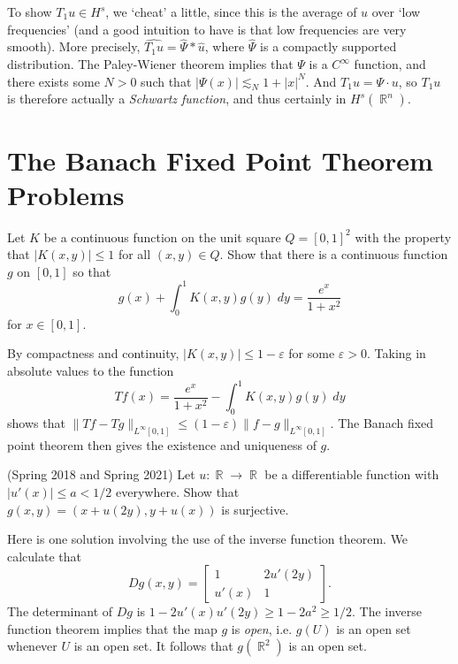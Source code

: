 \documentclass[answers]{exam}
\DeclareMathOperator{\RR}{\mathbb{R}}
\begin{document}
\begin{questions}
\begin{solution}
    To show $T_1 u \in H^s$, we `cheat' a little, since this is the average of $u$ over `low frequencies' (and a good intuition to have is that low frequencies are very smooth). More precisely, $\widehat{T_1 u} = \widehat{\Psi} * \widehat{u}$, where $\widehat{\Psi}$ is a compactly supported distribution. The Paley-Wiener theorem implies that $\Psi$ is a $C^\infty$ function, and there exists some $N > 0$ such that $|\Psi(x)| \lesssim_N 1 + |x|^N$. And $T_1 u = \Psi \cdot u$, so $T_1 u$ is therefore actually a \emph{Schwartz function}, and thus certainly in $H^s(\RR^n)$.
\end{solution}

\newpage
\section{The Banach Fixed Point Theorem Problems}

\question Let $K$ be a continuous function on the unit square $Q = [0,1]^2$ with the property that $|K(x,y)| \leq 1$ for all $(x,y) \in Q$. Show that there is a continuous function $g$ on $[0,1]$ so that
%
\[ g(x) + \int_0^1 K(x,y) g(y)\; dy = \frac{e^x}{1 + x^2} \]
%
for $x \in [0,1]$.
\begin{solution}
	By compactness and continuity, $|K(x,y)| \leq 1 - \varepsilon$ for some $\varepsilon > 0$. Taking in absolute values to the function
	\[ Tf(x) = \frac{e^x}{1 + x^2} - \int_0^1 K(x,y) g(y)\; dy \]
	shows that $\| Tf - Tg \|_{L^\infty[0,1]} \leq (1 - \varepsilon) \| f - g \|_{L^\infty[0,1]}$. The Banach fixed point theorem then gives the existence and uniqueness of $g$.
\end{solution}

	\question (Spring 2018 and Spring 2021)
	Let $u: \RR \to \RR$ be a differentiable function with $|u'(x)| \leq a < 1/2$ everywhere. Show that $g(x,y)	= (x + u(2y), y + u(x))$ is surjective.
\begin{solution}
	Here is one solution involving the use of the inverse function theorem. We calculate that
	\[ Dg(x,y) = \begin{bmatrix} 1 & 2u'(2y) \\ u'(x) & 1 \end{bmatrix}. \]
	The determinant of $Dg$ is $1 - 2 u'(x) u'(2y) \geq 1 - 2 a^2 \geq 1/2$. The inverse function theorem implies that the map $g$ is \emph{open}, i.e. $g(U)$ is an open set whenever $U$ is an open set. It follows that $g(\RR^2)$ is an open set.


\end{solution}
\end{questions}
\end{document}
